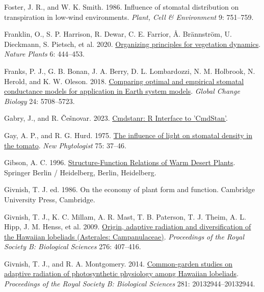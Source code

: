 \documentclass[
  letterpaper,
  DIV=11,
  numbers=noendperiod]{scrartcl}
\newlength{\cslhangindent}
\newlength{\cslentryspacingunit} %
\newenvironment{CSLReferences}[2] %
 {%
  \setlength{\parindent}{0pt}
  \ifodd #1
  \let\oldpar\par
  \def\par{\hangindent=\cslhangindent\oldpar}
  \fi
  \setlength{\parskip}{#2\cslentryspacingunit}
 }%
 {}
\begin{document}
\begin{CSLReferences}{1}{0}
\leavevmode{}%
Foster, J. R., and W. K. Smith. 1986. Influence of stomatal distribution
on transpiration in low-wind environments. \emph{Plant, Cell \&
Environment} 9: 751--759.

\leavevmode{}%
Franklin, O., S. P. Harrison, R. Dewar, C. E. Farrior, Å. Brännström, U.
Dieckmann, S. Pietsch, et al. 2020.
\href{https://doi.org/10.1038/s41477-020-0655-x}{Organizing principles
for vegetation dynamics}. \emph{Nature Plants} 6: 444--453.

\leavevmode{}%
Franks, P. J., G. B. Bonan, J. A. Berry, D. L. Lombardozzi, N. M.
Holbrook, N. Herold, and K. W. Oleson. 2018.
\href{https://doi.org/10.1111/gcb.14445}{Comparing optimal and empirical
stomatal conductance models for application in {Earth} system models}.
\emph{Global Change Biology} 24: 5708--5723.

\leavevmode{}%
Gabry, J., and R. Češnovar. 2023.
\href{https://mc-stan.org/cmdstanr,\%20https://discourse.mc-stan.org}{Cmdstanr:
{R} {Interface} to '{CmdStan}'}.

\leavevmode{}%
Gay, A. P., and R. G. Hurd. 1975.
\href{https://doi.org/10.1111/j.1469-8137.1975.tb01368.x}{The influence
of light on stomatal density in the tomato}. \emph{New Phytologist} 75:
37--46.

\leavevmode{}%
Gibson, A. C. 1996.
\href{http://public.eblib.com/choice/PublicFullRecord.aspx?p=6495247}{Structure-{Function}
{Relations} of {Warm} {Desert} {Plants}}. Springer Berlin / Heidelberg,
Berlin, Heidelberg.

\leavevmode{}%
Givnish, T. J. ed. 1986. On the economy of plant form and function.
Cambridge University Press, Cambridge.

\leavevmode{}%
Givnish, T. J., K. C. Millam, A. R. Mast, T. B. Paterson, T. J. Theim,
A. L. Hipp, J. M. Henss, et al. 2009.
\href{https://doi.org/10.1098/rspb.2008.1204}{Origin, adaptive radiation
and diversification of the {Hawaiian} lobeliads ({Asterales}:
{Campanulaceae})}. \emph{Proceedings of the Royal Society B: Biological
Sciences} 276: 407--416.

\leavevmode{}%
Givnish, T. J., and R. A. Montgomery. 2014.
\href{https://doi.org/10.1098/rspb.2013.2944}{Common-garden studies on
adaptive radiation of photosynthetic physiology among {Hawaiian}
lobeliads}. \emph{Proceedings of the Royal Society B: Biological
Sciences} 281: 20132944--20132944.


\end{CSLReferences}
\end{document}
